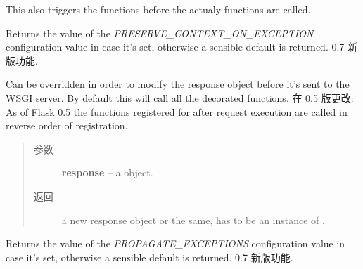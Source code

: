 \documentclass[a4paper,12pt]{sphinxmanual}
\begin{document}
\begin{fulllineitems}
\begin{fulllineitems}
This also triggers the  functions before
the actualy {\hyperref[api:flask.Flask.before_request]{}} functions are called.

\end{fulllineitems}


\begin{fulllineitems}
\label{api:flask.Flask.preserve_context_on_exception}
Returns the value of the \emph{PRESERVE\_CONTEXT\_ON\_EXCEPTION}
configuration value in case it's set, otherwise a sensible default
is returned.
0.7 新版功能.
\end{fulllineitems}


\begin{fulllineitems}
\label{api:flask.Flask.process_response}
Can be overridden in order to modify the response object
before it's sent to the WSGI server.  By default this will
call all the {\hyperref[api:flask.Flask.after_request]{}} decorated functions.
在 0.5 版更改: As of Flask 0.5 the functions registered for after request
execution are called in reverse order of registration.\begin{quote}\begin{description}
\item[{参数}] \leavevmode
\textbf{response} -- a {\hyperref[api:flask.Flask.response_class]{}} object.

\item[{返回}] \leavevmode
a new response object or the same, has to be an
instance of {\hyperref[api:flask.Flask.response_class]{}}.

\end{description}\end{quote}

\end{fulllineitems}


\begin{fulllineitems}
\label{api:flask.Flask.propagate_exceptions}
Returns the value of the \emph{PROPAGATE\_EXCEPTIONS} configuration
value in case it's set, otherwise a sensible default is returned.
0.7 新版功能.
\end{fulllineitems}


\end{fulllineitems}
\end{document}
